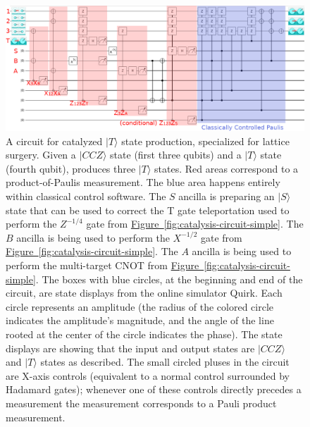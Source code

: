 \documentclass[superscriptaddress,notitlepage,longbibliography]{revtex4-1}
\newcommand{\fig}[1]{\hyperref[fig:#1]{Figure~\ref*{fig:#1}}}
\begin{document}
\begin{figure}[ht]
    \label{fig:catalysis-circuit}
    \centering
    \includegraphics[width=\textwidth,height=\dimexpr\textheight-11\baselineskip,keepaspectratio]{catalysis-circuit.png}
    \caption{
      A circuit for catalyzed $|T\rangle$ state production, specialized for lattice surgery.
      Given a $|CCZ\rangle$ state (first three qubits) and a $|T\rangle$ state (fourth qubit), produces three $|T\rangle$ states.
      Red areas correspond to a product-of-Paulis measurement.
      The blue area happens entirely within classical control software.
      The $S$ ancilla is preparing an $|S\rangle$ state that can be used to correct the T gate teleportation used to perform the $Z^{-1/4}$ gate from \fig{catalysis-circuit-simple}.
      The $B$ ancilla is being used to perform the $X^{-1/2}$ gate from \fig{catalysis-circuit-simple}.
      The $A$ ancilla is being used to perform the multi-target CNOT from \fig{catalysis-circuit-simple}.
      The boxes with blue circles, at the beginning and end of the circuit, are state displays from the online simulator Quirk.
      Each circle represents an amplitude (the radius of the colored circle indicates the amplitude's magnitude, and the angle of the line rooted at the center of the circle indicates the phase).
      The state displays are showing that the input and output states are $|CCZ\rangle$ and $|T\rangle$ states as described.
      The small circled pluses in the circuit are X-axis controls (equivalent to a normal control surrounded by Hadamard gates); whenever one of these controls directly precedes a measurement the measurement corresponds to a Pauli product measurement.
}
\end{figure}
\end{document}
